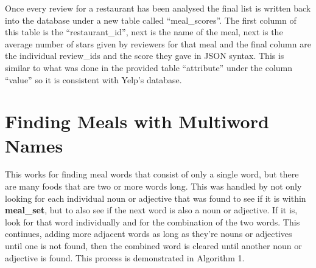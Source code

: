 \documentclass[12pt, openany]{scrbook}
\begin{document}
Once every review for a restaurant has been analysed the final list is
written back into the database under a new table called ``meal\_scores''.
The first column of this table is the ``restaurant\_id'', next is the name of the meal,
next is the average number of stars given by reviewers for that meal and the
final column are the individual review\_ids and the score they gave in JSON
syntax.
This is similar to what was done in the provided table ``attribute'' under
the column ``value'' so it is consistent with Yelp's database.

\section{Finding Meals with Multiword Names}
This works for finding meal words that consist of only a single word,
but there are many foods that are two or more words long.
This was handled by not only looking for each individual noun or adjective
that was found to see if it is within \textbf{meal\_set}, but to also see
if the next word is also a noun or adjective.
If it is, look for that word individually and for the combination of the two words.
This continues, adding more adjacent words as long as they're nouns or
adjectives until one is not found, then the combined word is cleared
until another noun or adjective is found.
This process is demonstrated in Algorithm 1.
\end{document}
